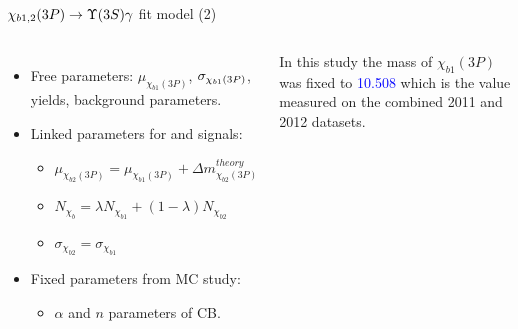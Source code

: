\begin{frame}{$\chi_{b1,2}(3P) \to \ThreeS \gamma$ fit model (2)}
\begin{columns}[T]
\begin{itemize}
\item Free parameters: $\mu_{\chi_{b1}(3P)}$, $\sigma_{\chi_{b 1}(3P)}$, yields, background parameters.
\item Linked parameters for \chibone and \chibtwo signals:
    \begin{itemize}
    \item $\mu_{\chi_{b2}(3P)} = \mu_{\chi_{b1}(3P)} + \Delta m_{\chi_{b2}(3P)}^{theory}$
    \item $N_{\chi_{b}} = \lambda N_{\chi_{b1}} + (1-\lambda) N_{\chi_{b2}}$
    \item $\sigma_{\chi_{b2}} = \sigma_{\chi_{b1}}$
    \end{itemize}

\item Fixed parameters from MC study:
    \begin{itemize}
    \item $\alpha$ and $n$ parameters of CB.
    \end{itemize}
\end{itemize}
%
\bigskip

In this study the mass of $\chi_{b1}(3P)$ was fixed to
\textcolor{blue}{10.508\gevcc} which is the value
measured on the combined 2011 and 2012 datasets.
\end{columns}


\end{frame}
